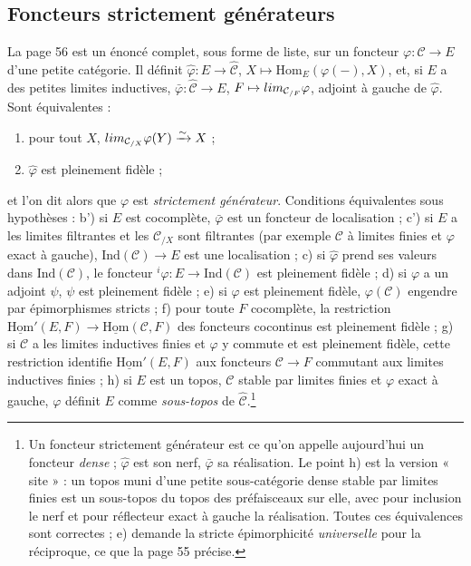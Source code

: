 \documentclass[11pt,a4paper]{article}
\begin{document}
\subsection*{Foncteurs strictement générateurs}

La page 56 est un énoncé complet, sous forme de liste, sur un foncteur
$\varphi : \mathcal{C} \to E$ d'une petite catégorie. Il définit
$\hat{\varphi} : E \to \widehat{\mathcal{C}}$, $X \mapsto \mathrm{Hom}_{E}
(\varphi(-), X)$, et, si $E$ a des petites limites inductives, $\bar{\varphi}
: \widehat{\mathcal{C}} \to E$, $F \mapsto \varinjlim_{\mathcal{C}_{/F}}
\varphi$, adjoint à gauche de $\hat\varphi$. Sont équivalentes :
\begin{enumerate}
\item[a)] pour tout $X$, $\varinjlim_{\mathcal{C}_{/X}} \varphi(Y)
\xrightarrow{\sim} X$ ;
\item[b)] $\hat\varphi$ est pleinement fidèle ;
\end{enumerate}
et l'on dit alors que $\varphi$ est \emph{strictement générateur}.
Conditions équivalentes sous hypothèses : b') si $E$ est cocomplète,
$\bar\varphi$ est un foncteur de localisation ; c') si $E$ a les limites
filtrantes et les $\mathcal{C}_{/X}$ sont filtrantes (par exemple
$\mathcal{C}$ à limites finies et $\varphi$ exact à gauche), $\mathrm{Ind}
(\mathcal{C}) \to E$ est une localisation ; c) si $\hat\varphi$ prend ses
valeurs dans $\mathrm{Ind}(\mathcal{C})$, le foncteur ${}^{i}\varphi : E \to
\mathrm{Ind}(\mathcal{C})$ est pleinement fidèle ; d) si $\varphi$ a un
adjoint $\psi$, $\psi$ est pleinement fidèle ; e) si $\varphi$ est
pleinement fidèle, $\varphi(\mathcal{C})$ engendre par épimorphismes
stricts ; f) pour toute $F$ cocomplète, la restriction $\underline{\mathrm{Hom}}'
(E, F) \to \underline{\mathrm{Hom}}(\mathcal{C}, F)$ des foncteurs
cocontinus est pleinement fidèle ; g) si $\mathcal{C}$ a les limites
inductives finies et $\varphi$ y commute et est pleinement fidèle, cette
restriction identifie $\underline{\mathrm{Hom}}'(E, F)$ aux foncteurs
$\mathcal{C} \to F$ commutant aux limites inductives finies ; h) si $E$ est
un topos, $\mathcal{C}$ stable par limites finies et $\varphi$ exact à
gauche, $\varphi$ définit $E$ comme \emph{sous-topos} de
$\widehat{\mathcal{C}}$.\footnote{Un foncteur strictement générateur est ce
qu'on appelle aujourd'hui un foncteur \emph{dense} ; $\hat\varphi$ est son
nerf, $\bar\varphi$ sa réalisation. Le point h) est la version « site » :
un topos muni d'une petite sous-catégorie dense stable par limites finies
est un sous-topos du topos des préfaisceaux sur elle, avec pour inclusion
le nerf et pour réflecteur exact à gauche la réalisation. Toutes ces
équivalences sont correctes ; e) demande la stricte épimorphicité
\emph{universelle} pour la réciproque, ce que la page 55 précise.}
\end{document}
